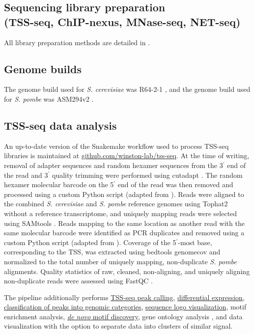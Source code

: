 \subsection{Sequencing library preparation\\(TSS-seq, ChIP-nexus, MNase-seq, NET-seq)}

All library preparation methods are detailed in \citet{doris2018}.

\subsection{Genome builds}

The genome build used for \textit{S. cerevisiae} was R64-2-1 \citep{engel2014}, and the genome build used for \textit{S. pombe} was ASM294v2 \citep{wood2002}.

\subsection{TSS-seq data analysis}
\label{subsec:tss_seq}

An up-to-date version of the Snakemake \citep{koster2012} workflow used to process TSS-seq libraries is maintained at \href{https://github.com/winston-lab/tss-seq}{github.com/winston-lab/tss-seq}.
At the time of writing, removal of adapter sequences and random hexamer sequences from the 3$^\prime$ end of the read and 3$^\prime$ quality trimming were performed using cutadapt \citep{martin2011}.
The random hexamer molecular barcode on the 5$^\prime$ end of the read was then removed and processed using a custom Python script (adapted from \citet{mayer2015}).
Reads were aligned to the combined \textit{S. cerevisiae} and \textit{S. pombe} reference genomes using Tophat2 \citep{kim2013} without a reference transcriptome, and uniquely mapping reads were selected using SAMtools \citep{li2009}.
Reads mapping to the same location as another read with the same molecular barcode were identified as PCR duplicates and removed using a custom Python script (adapted from \citet{mayer2015}).
Coverage of the 5$^\prime$-most base, corresponding to the TSS, was extracted using bedtools genomecov \citep{quinlan2010} and normalized to the total number of uniquely mapping, non-duplicate \textit{S. pombe} alignments.
Quality statistics of raw, cleaned, non-aligning, and uniquely aligning non-duplicate reads were assessed using FastQC \citep{andrews2010}.

The pipeline additionally performs \hyperref[subsubsec:tss_peak_calling]{TSS-seq peak calling}, \hyperref[subsubsec:tss_differential_expression]{differential expression}, \hyperref[subsubsec:tss_peak_classification]{classification of peaks into genomic categories}, \hyperref[subsubsec:tss_seqlogos]{sequence logo visualization}, motif enrichment analysis, \hyperref[subsubsec:denovo_motif_discovery]{\textit{de novo} motif discovery}, gene ontology analysis \citep{young2010}, and data visualization with the option to separate data into clusters of similar signal.

